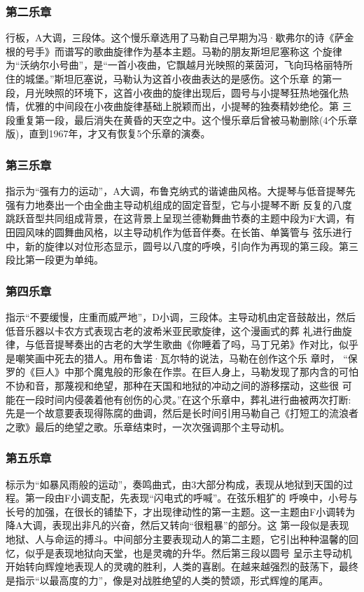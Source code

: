 \documentclass[a4paper,left=2.5cm,right=2.5cm,11pt]{article}
\begin{document}
\subsubsection{第二乐章}
	行板，A大调，三段体。这个慢乐章选用了马勒自己早期为冯·歇弗尔的诗《萨金根的号手》而谱写的歌曲旋律作为基本主题。马勒的朋友斯坦尼塞称这 个旋律为“沃纳尔小号曲”，是“一首小夜曲，它飘越月光映照的莱茵河，飞向玛格丽特所住的城堡。”斯坦厄塞说，马勒认为这首小夜曲表达的是感伤。这个乐章 的第一段，月光映照的环境下，这首小夜曲的旋律出现后，圆号与小提琴狂热地强化热情，优雅的中间段在小夜曲旋律基础上脱颖而出，小提琴的独奏精妙绝伦。第 三段重复第一段，最后消失在黄昏的天空之中。这个慢乐章后曾被马勒删除(4个乐章版)，直到1967年，才又有恢复5个乐章的演奏。

\subsubsection{第三乐章}
	指示为“强有力的运动”，A大调，布鲁克纳式的谐谑曲风格。大提琴与低音提琴先强有力地奏出一个由全曲主导动机组成的固定音型，它与小提琴不断 反复的八度跳跃音型共同组成背景，在这背景上呈现兰德勒舞曲节奏的主题中段为F大调，有田园风味的圆舞曲风格，以主导动机作为低音伴奏。在长笛、单簧管与 弦乐进行中，新的旋律以对位形态显示，圆号以八度的呼唤，引向作为再现的第三段。第三段比第一段更为单纯。

\subsubsection{第四乐章}
	指示“不要缓慢，庄重而威严地”，D小调，三段体。主导动机由定音鼓敲出，然后低音乐器以卡农方式表现古老的波希米亚民歌旋律，这个漫画式的葬 礼进行曲旋律，与低音提琴奏出的古老的大学生歌曲《你睡着了吗，马丁兄弟》作对比，似乎是嘲笑画中死去的猎人。用布鲁诺·瓦尔特的说法，马勒在创作这个乐 章时， “保罗的《巨人》中那个魔鬼般的形象在作祟。在巨人身上，马勒发现了那内含的可怕不协和音，那蔑视和绝望，那种在天国和地狱的冲动之间的游移摆动，这些很 可能在一段时间内侵袭着他有创伤的心灵。”在这个乐章中，葬礼进行曲被两次打断: 先是一个故意要表现得陈腐的曲调，然后是长时间引用马勒自己《打短工的流浪者之歌》最后的绝望之歌。乐章结束时，一次次强调那个主导动机。

\subsubsection{第五乐章}
	标示为“如暴风雨般的运动”，奏鸣曲式，由3大部分构成，表现从地狱到天国的过程。第一段由F小调支配，先表现“闪电式的呼喊”。在弦乐粗犷的 呼唤中，小号与长号的加强，在很长的铺垫下，才出现律动性的第一主题。这一主题由F小调转为降A大调，表现出非凡的兴奋，然后又转向“很粗暴”的部分。这 第一段似是表现地狱、人与命运的搏斗。中间部分主要表现动人的第二主题，它引出种种温馨的回忆，似乎是表现地狱向天堂，也是灵魂的升华。然后第三段以圆号 呈示主导动机开始转向辉煌地表现人的灵魂的胜利，人类的喜剧。在越来越强烈的鼓荡下，最终是指示“以最高度的力”，像是对战胜绝望的人类的赞颂，形式辉煌的尾声。
\end{document}
